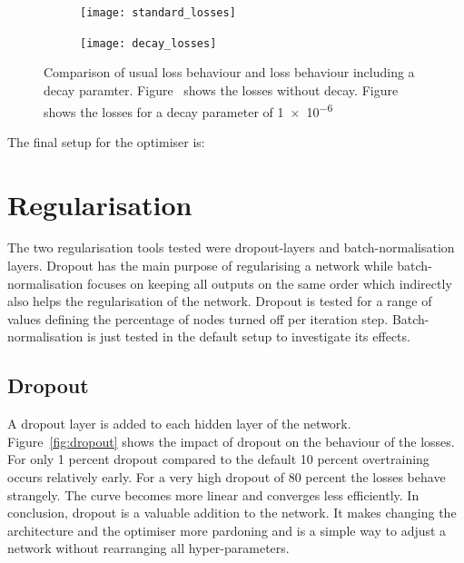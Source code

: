 \begin{figure}[htbp]
    \centering
    \begin{subfigure}[b]{0.45\textwidth}
        \texttt{[image: standard\_losses]}
        \caption{}
        \label{fig:decay:standard}
    \end{subfigure}
\quad
    \begin{subfigure}[b]{0.45\textwidth}
        \texttt{[image: decay\_losses]}
        \caption{}
        \label{fig:decay:decay}
    \end{subfigure}
    \caption{Comparison of usual loss behaviour and loss behaviour including a decay paramter. Figure~ shows the losses without decay. Figure~ shows the losses for a decay parameter of \num{1e-6}}
	\label{fig:decay}
\end{figure}

The final setup for the optimiser is:




\section{Regularisation}

The two regularisation tools tested were dropout-layers and batch-normalisation layers. Dropout has the main purpose of regularising a network while batch-normalisation focuses on keeping all outputs on the same order which indirectly also helps the regularisation of the network.
Dropout is tested for a range of values defining the percentage of nodes turned off per iteration step. Batch-normalisation is just tested in the default setup to investigate its effects.

\subsection{Dropout}
\label{sec:dropout}

A dropout layer is added to each hidden layer of the network.
Figure~\ref{fig:dropout} shows the impact of dropout on the behaviour of the losses. For only \num{1} percent dropout compared to the default \num{10} percent overtraining occurs relatively early. For a very high dropout of \num{80} percent the losses behave strangely. The curve becomes more linear and converges less efficiently. In conclusion, dropout is a valuable addition to the network. It makes changing the architecture and the optimiser more pardoning and is a simple way to adjust a network without rearranging all hyper-parameters.

